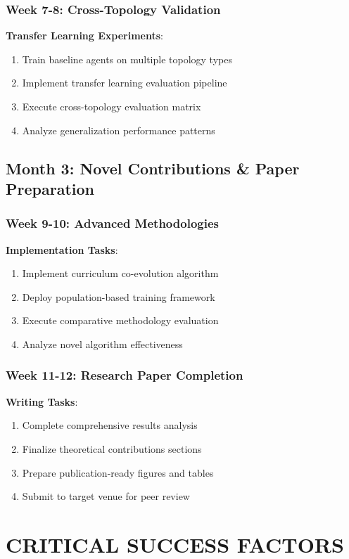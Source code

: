 \documentclass[11pt]{article}
\begin{document}
\subsubsection{Week 7-8: Cross-Topology Validation}
\textbf{Transfer Learning Experiments}:
\begin{enumerate}
\item Train baseline agents on multiple topology types
\item Implement transfer learning evaluation pipeline
\item Execute cross-topology evaluation matrix
\item Analyze generalization performance patterns
\end{enumerate}

\subsection{Month 3: Novel Contributions \& Paper Preparation}

\subsubsection{Week 9-10: Advanced Methodologies}
\textbf{Implementation Tasks}:
\begin{enumerate}
\item Implement curriculum co-evolution algorithm
\item Deploy population-based training framework
\item Execute comparative methodology evaluation
\item Analyze novel algorithm effectiveness
\end{enumerate}

\subsubsection{Week 11-12: Research Paper Completion}
\textbf{Writing Tasks}:
\begin{enumerate}
\item Complete comprehensive results analysis
\item Finalize theoretical contributions sections
\item Prepare publication-ready figures and tables
\item Submit to target venue for peer review
\end{enumerate}

\section{CRITICAL SUCCESS FACTORS}
\end{document}
